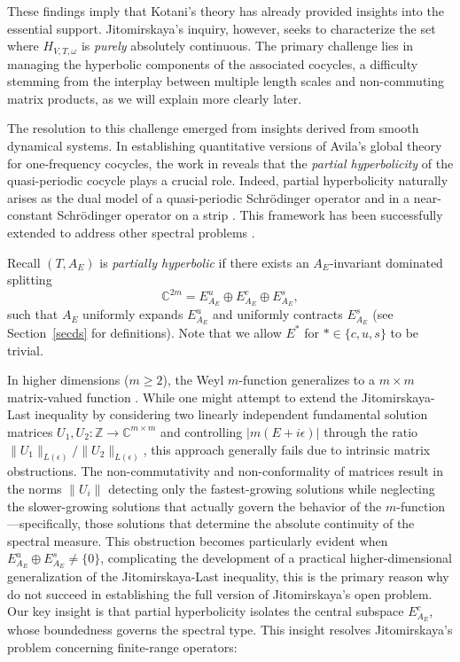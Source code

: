 \documentclass[11pt]{amsart}
\theoremstyle{remark}
\theoremstyle{definition}
\begin{document}
These findings imply that Kotani's theory \cite{KS} has already provided insights into the essential support. Jitomirskaya's inquiry, however, seeks to characterize the set where $H_{V,T,\omega}$ is \textit{purely} absolutely continuous. The primary challenge lies in managing the hyperbolic components of the associated cocycles, a difficulty stemming from the interplay between multiple length scales and non-commuting matrix products, as we will explain more clearly later. 

The resolution to this challenge emerged from insights derived from smooth dynamical systems. In establishing quantitative versions of Avila's global theory for one-frequency cocycles, the work in \cite{GJYZ} reveals that the \emph{partial hyperbolicity} of the quasi-periodic cocycle plays a crucial role. Indeed, partial hyperbolicity naturally arises as the dual model of a quasi-periodic Schr\"odinger operator \cite{GJYZ} and in a near-constant Schr\"odinger operator on a strip \cite{WXYZ}. This framework has been successfully extended to address other spectral problems \cite{GJ,GJY}.



Recall $(T,A_E)$ is \emph{partially hyperbolic} if there exists an $A_E$-invariant dominated splitting
$$
\mathbb{C}^{2m} = E^u_{A_E} \oplus E^c_{A_E} \oplus E^s_{A_E},
$$
such that $A_E$ uniformly expands $E^u_{A_E}$ and uniformly contracts $E^s_{A_E}$ (see Section~\ref{secds} for definitions). Note that we allow $E^\ast$ for $\ast \in \{c,u,s\}$ to be trivial.

In higher dimensions ($m \geq 2$), the Weyl $m$-function generalizes to a $m \times m$ matrix-valued function \cite{KS}. While one might attempt to extend the Jitomirskaya-Last inequality by considering two linearly independent fundamental solution matrices $U_1, U_2: \mathbb{Z} \to \mathbb{C}^{m\times m}$ and controlling $|m(E+i\epsilon)|$ through the ratio $\|U_1\|_{L(\epsilon)}/\|U_2\|_{L(\epsilon)}$, this approach generally fails due to intrinsic matrix obstructions. The non-commutativity and non-conformality of matrices result in the norms $\|U_i\|$ detecting only the fastest-growing solutions while neglecting the slower-growing solutions that actually govern the behavior of the $m$-function—specifically, those solutions that determine the absolute continuity of the spectral measure. This obstruction becomes particularly evident when $E^u_{A_E} \oplus E^s_{A_E} \neq \{0\}$, complicating the development of a practical higher-dimensional generalization of the Jitomirskaya-Last inequality,  this is the primary reason why \cite{MS,OC} do not succeed in establishing the full version of Jitomirskaya's open problem.
Our key insight is that partial hyperbolicity isolates the central subspace $E^c_{A_E}$, whose boundedness governs the spectral type. This insight resolves Jitomirskaya's problem concerning finite-range operators:
\end{document}
